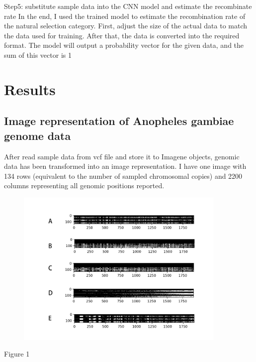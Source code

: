 \documentclass[11pt,a4 paper,title page]{article}
\begin{document}
  Step5: substitute sample data into the CNN model and estimate the recombinate rate
In the end, I used the trained model to estimate the recombination rate of the natural selection category. First, adjust the size of the actual data to match the data used for training. After that, the data is converted into the required format. The model will output a probability vector for the given data, and the sum of this vector is 1
  \hfill\break
  \section{Results}
    \subsection{Image representation of Anopheles gambiae genome data}
  After read sample data from vcf file and store it to Imagene objects, genomic data has been transformed into an image representation. I have one image with 134 rows (equivalent to the number of sampled chromosomal copies) and 2200 columns representing all genomic positions reported.
\begin{figure}[H]
\centering
\includegraphics[width=0.9\textwidth,angle=360]{../picture/figure1.png}
\end{figure}
\centerline{Figure 1}
\end{document}
